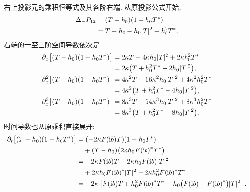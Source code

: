 \par\smallskip\noindent 右上投影元的乘积恒等式及其各阶右端.\quad
从原投影公式开始,
\begin{align*}
\Delta_-P_{12}
&=(T-h_0)(1-h_0{T}^{*})\\
&=T-h_0-h_0|T|^2+h_0^2{T}^{*}.
\end{align*}
右端的一至三阶空间导数依次是
\begin{align*}
\partial_x\bigl[(T-h_0)(1-h_0{T}^{*})\bigr]
&=2\kappa T-4\kappa h_0|T|^2
+2\kappa h_0^2{T}^{*}\\
&=2\kappa\bigl(T+h_0^2{T}^{*}-2h_0|T|^2\bigr),\\
\partial_x^2\bigl[(T-h_0)(1-h_0{T}^{*})\bigr]
&=4\kappa^2T-16\kappa^2h_0|T|^2
+4\kappa^2h_0^2{T}^{*}\\
&=4\kappa^2\bigl(T+h_0^2{T}^{*}-4h_0|T|^2\bigr),\\
\partial_x^3\bigl[(T-h_0)(1-h_0{T}^{*})\bigr]
&=8\kappa^3T-64\kappa^3h_0|T|^2
+8\kappa^3h_0^2{T}^{*}\\
&=8\kappa^3\bigl(T+h_0^2{T}^{*}-8h_0|T|^2\bigr).
\end{align*}
时间导数也从原乘积直接展开:
\begin{align*}
\partial_t\bigl[(T-h_0)(1-h_0{T}^{*})\bigr]
&=(-2\kappa F(\mathrm{i} b)T)(1-h_0{T}^{*})\\
&\quad+(T-h_0)
\bigl(2\kappa h_0{F(\mathrm{i} b)}^{*}{T}^{*}\bigr)\\
&=-2\kappa F(\mathrm{i} b)T
+2\kappa h_0F(\mathrm{i} b)|T|^2\\
&\quad+2\kappa h_0{F(\mathrm{i} b)}^{*}|T|^2
-2\kappa h_0^2{F(\mathrm{i} b)}^{*}{T}^{*}\\
&=-2\kappa\left[
F(\mathrm{i} b)T+h_0^2{F(\mathrm{i} b)}^{*}{T}^{*}
-h_0\bigl(F(\mathrm{i} b)+{F(\mathrm{i} b)}^{*}\bigr)|T|^2
\right].
\end{align*}

